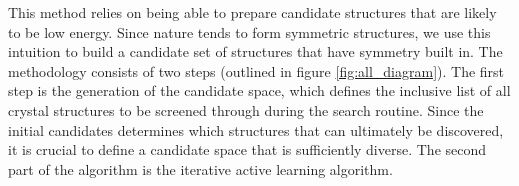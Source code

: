 %
This method relies on being able to prepare candidate structures that are likely to be low energy.
%
Since nature tends to form symmetric structures, we use this intuition to build a candidate set of structures that have symmetry built in.
%
The methodology consists of two steps (outlined in figure \ref{fig:all_diagram}).
%
The first step is the generation of the candidate space,
which defines the inclusive list of all crystal structures to be screened through during the search routine.
%
Since the initial candidates determines which structures that can ultimately be discovered, it is crucial to define a candidate space that is sufficiently diverse.
%
The second part of the algorithm is the iterative active learning algorithm.




